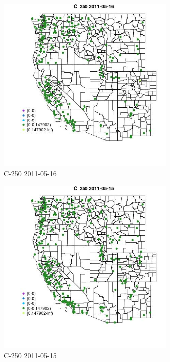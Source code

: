 \begin{figure} 
\centering  
\includegraphics[width=0.77\textwidth]{Code_Outputs/ML_input_report_ML_input_PM25_Step5_part_d_de_duplicated_aves_ML_input_MapObsC_2502011-05-16.jpg} 
\caption{\label{fig:ML_input_report_ML_input_PM25_Step5_part_d_de_duplicated_aves_ML_inputMapObsC_2502011-05-16}C-250 2011-05-16} 
\end{figure} 
 

\begin{figure} 
\centering  
\includegraphics[width=0.77\textwidth]{Code_Outputs/ML_input_report_ML_input_PM25_Step5_part_d_de_duplicated_aves_ML_input_MapObsC_2502011-05-15.jpg} 
\caption{\label{fig:ML_input_report_ML_input_PM25_Step5_part_d_de_duplicated_aves_ML_inputMapObsC_2502011-05-15}C-250 2011-05-15} 
\end{figure} 
 

